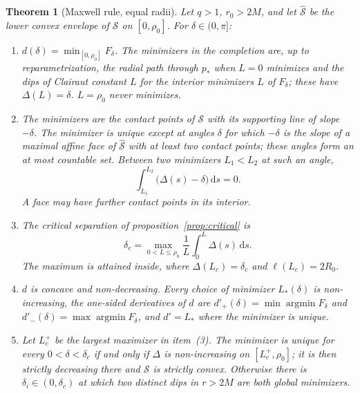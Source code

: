 \documentclass[aip,jmp,amsmath,amssymb,reprint]{revtex4-2}
\newcommand{\dd}{\mathrm{d}}
\theoremstyle{plain}
\newtheorem{theorem}{Theorem}
\theoremstyle{definition}
\begin{document}
\begin{theorem}[Maxwell rule, equal radii]\label{thm:maxwell}
Let $q>1$, $r_0>2M$, and let $\hat{\mathcal S}$ be the lower convex envelope of $\mathcal S$ on
$[0,\rho_0]$. For $\delta\in(0,\pi]$:
\begin{enumerate}
\item $d(\delta)=\min_{[0,\rho_0]}F_\delta$. The minimizers in the completion are, up to
  reparametrization, the radial path through $p_*$ when $L=0$ minimizes and the dips of
  Clairaut constant $L$ for the interior minimizers $L$ of $F_\delta$; these have $\Delta(L)=\delta$.
  $L=\rho_0$ never minimizes.
\item The minimizers are the contact points of $\mathcal S$ with its supporting line of
  slope $-\delta$. The minimizer is unique except at angles $\delta$ for which $-\delta$ is the
  slope of a maximal affine face of $\hat{\mathcal S}$ with at least two contact points; these
  angles form an at most countable set. Between two minimizers $L_1<L_2$ at such an angle,
  \[
    \int_{L_1}^{L_2}\bigl(\Delta(s)-\delta\bigr)\,\dd s=0 .
  \]
  A face may have further contact points in its interior.
\item The critical separation of proposition~\ref{prop:critical} is
  \[
    \delta_c=\max_{0<L\le\rho_0}\frac1L\int_0^L\Delta(s)\,\dd s .
  \]
  The maximum is attained inside, where $\Delta(L_c)=\delta_c$ and $\ell(L_c)=2R_0$.
\item $d$ is concave and non-decreasing. Every choice of minimizer $L_*(\delta)$ is
  non-increasing, the one-sided derivatives of $d$ are $d'_+(\delta)=\min\operatorname{argmin}F_\delta$
  and $d'_-(\delta)=\max\operatorname{argmin}F_\delta$, and $d'=L_*$ where the minimizer is unique.
\item Let $L_c^+$ be the largest maximizer in item~(3). The minimizer is unique for every
  $0<\delta<\delta_c$ if and only if $\Delta$ is non-increasing on $[L_c^+,\rho_0]$; it is then
  strictly decreasing there and $\mathcal S$ is strictly convex. Otherwise there is
  $\delta_i\in(0,\delta_c)$ at which two distinct dips in $r>2M$ are both global minimizers.
\end{enumerate}
\end{theorem}
\end{document}
